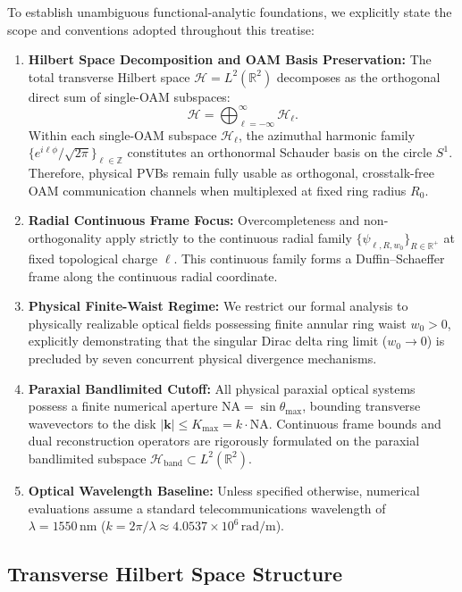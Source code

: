\documentclass{optica-article}
\begin{document}
To establish unambiguous functional-analytic foundations, we explicitly state the scope and conventions adopted throughout this treatise:
\begin{enumerate}
    \item \textbf{Hilbert Space Decomposition and OAM Basis Preservation:} The total transverse Hilbert space $\mathcal{H} = L^2(\mathbb{R}^2)$ decomposes as the orthogonal direct sum of single-OAM subspaces:
    \begin{equation}
    \mathcal{H} = \bigoplus_{\ell=-\infty}^\infty \mathcal{H}_\ell.
    \label{eq:direct_sum_decomposition_intro}
    \end{equation}
    Within each single-OAM subspace $\mathcal{H}_\ell$, the azimuthal harmonic family $\{e^{i\ell\phi}/\sqrt{2\pi}\}_{\ell \in \mathbb{Z}}$ constitutes an orthonormal Schauder basis on the circle $S^1$. Therefore, physical PVBs remain fully usable as orthogonal, crosstalk-free OAM communication channels when multiplexed at fixed ring radius $R_0$.
    \item \textbf{Radial Continuous Frame Focus:} Overcompleteness and non-orthogonality apply strictly to the continuous radial family $\{\psi_{\ell, R, w_0}\}_{R \in \mathbb{R}^+}$ at fixed topological charge $\ell$. This continuous family forms a Duffin--Schaeffer frame along the continuous radial coordinate.
    \item \textbf{Physical Finite-Waist Regime:} We restrict our formal analysis to physically realizable optical fields possessing finite annular ring waist $w_0 > 0$, explicitly demonstrating that the singular Dirac delta ring limit ($w_0 \to 0$) is precluded by seven concurrent physical divergence mechanisms.
    \item \textbf{Paraxial Bandlimited Cutoff:} All physical paraxial optical systems possess a finite numerical aperture $\text{NA} = \sin \theta_{\max}$, bounding transverse wavevectors to the disk $|\mathbf{k}| \le K_{\max} = k \cdot \text{NA}$. Continuous frame bounds and dual reconstruction operators are rigorously formulated on the paraxial bandlimited subspace $\mathcal{H}_{\text{band}} \subset L^2(\mathbb{R}^2)$.
    \item \textbf{Optical Wavelength Baseline:} Unless specified otherwise, numerical evaluations assume a standard telecommunications wavelength of $\lambda = 1550\,\text{nm}$ ($k = 2\pi/\lambda \approx 4.0537 \times 10^6\,\text{rad/m}$).
\end{enumerate}

\subsection{Transverse Hilbert Space Structure}
\end{document}
